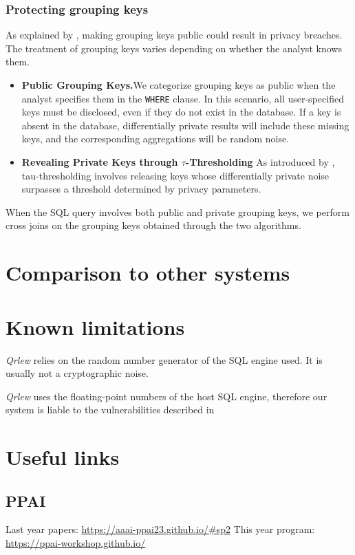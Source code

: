 \documentclass[letterpaper]{article} %
\newcommand{\qrlew}{\emph{Qrlew}}
\begin{document}
\subsubsection{Protecting grouping keys}
As explained by \citeauthor{wilson2019differentially}, making grouping keys public could result in privacy breaches.
The treatment of grouping keys varies depending on whether the analyst knows them.

\begin{itemize}
	\item \textbf{Public Grouping Keys.}We categorize grouping keys as public when the analyst specifies them in the \texttt{WHERE} clause.
	In this scenario, all user-specified keys must be disclosed, even if they do not exist in the database.
	If a key is absent in the database, differentially private results will include these missing keys, and the corresponding aggregations will be random noise.
	\item \textbf{Revealing Private Keys through $\tau$-Thresholding}
	As introduced by \citeauthor{wilson2019differentially}, tau-thresholding involves releasing keys whose differentially private noise surpasses a threshold determined by privacy parameters.
\end{itemize}

When the SQL query involves both public and private grouping keys, we perform cross joins on the grouping keys obtained through the two algorithms.

\section{Comparison to other systems}

\section{Known limitations}

\qrlew{} relies on the random number generator of the SQL engine used. It is usually not a cryptographic noise.

\qrlew{} uses the floating-point numbers of the host SQL engine, therefore our system is liable to the vulnerabilities described in


\section*{Useful links}
\subsection{PPAI}
Last year papers:
\url{https://aaai-ppai23.github.io/#sp2}
This year program:
\url{https://ppai-workshop.github.io/}
\end{document}
